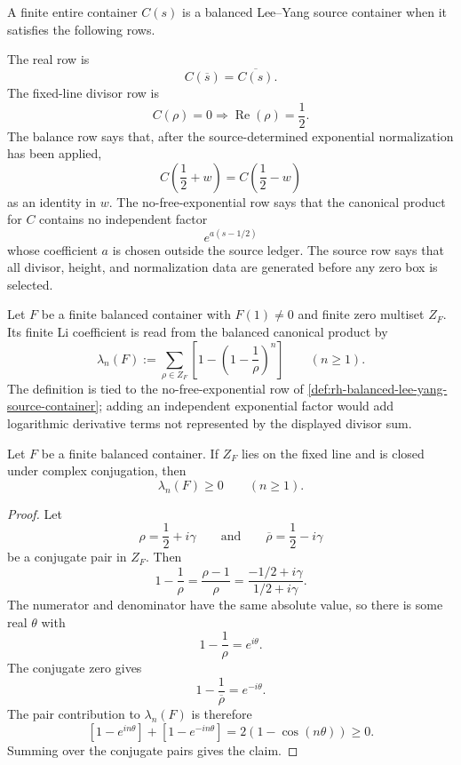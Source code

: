 \begin{definition}
\label{def:rh-balanced-lee-yang-source-container}
A finite entire container $C(s)$ is a balanced Lee--Yang source
container when it satisfies the following rows.

The real row is
$$
C(\overline{s})=\overline{C(s)}.
$$
The fixed-line divisor row is
$$
C(\rho)=0
\Longrightarrow
\operatorname{Re}(\rho)=\frac12.
$$
The balance row says that, after the source-determined exponential
normalization has been applied,
$$
C\left(\frac12+w\right)
=
C\left(\frac12-w\right)
$$
as an identity in $w$.  The no-free-exponential row says that the
canonical product for $C$ contains no independent factor
$$
e^{a(s-1/2)}
$$
whose coefficient $a$ is chosen outside the source ledger.  The
source row says that all divisor, height, and normalization data are
generated before any zero box is selected.
\end{definition}

\begin{definition}
\label{def:rh-finite-balanced-li-coefficient}
Let $F$ be a finite balanced container with $F(1)\ne0$ and finite zero
multiset $Z_F$.  Its finite Li coefficient is read from the balanced
canonical product by
$$
\lambda_n(F)
:=
\sum_{\rho\in Z_F}
\left[
1-\left(1-\frac1\rho\right)^n
\right]
\qquad
(n\ge1).
$$
The definition is tied to the no-free-exponential row of
\autoref{def:rh-balanced-lee-yang-source-container}; adding an
independent exponential factor would add logarithmic derivative terms
not represented by the displayed divisor sum.
\end{definition}

\begin{theorem}
\label{thm:rh-finite-balanced-critical-line-divisors-li-positive}
Let $F$ be a finite balanced container.  If $Z_F$ lies on the fixed line
and is closed under complex conjugation, then
$$
\lambda_n(F)\ge0
\qquad
(n\ge1).
$$
\end{theorem}

\begin{proof}
Let
$$
\rho=\frac12+i\gamma
\qquad
\text{and}
\qquad
\overline{\rho}=\frac12-i\gamma
$$
be a conjugate pair in $Z_F$.  Then
$$
1-\frac1\rho
=
\frac{\rho-1}{\rho}
=
\frac{-1/2+i\gamma}{1/2+i\gamma}.
$$
The numerator and denominator have the same absolute value, so there is
some real $\theta$ with
$$
1-\frac1\rho=e^{i\theta}.
$$
The conjugate zero gives
$$
1-\frac1{\overline{\rho}}=e^{-i\theta}.
$$
The pair contribution to $\lambda_n(F)$ is therefore
$$
\left[1-e^{in\theta}\right]
+
\left[1-e^{-in\theta}\right]
=
2\left(1-\cos(n\theta)\right)
\ge0.
$$
Summing over the conjugate pairs gives the claim.
\end{proof}

